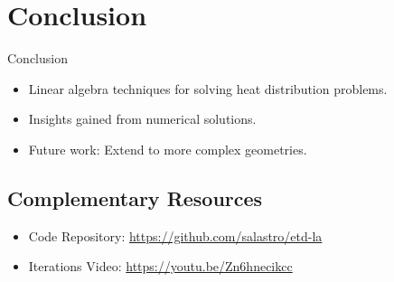 \documentclass[aspectratio=169]{beamer}
\begin{document}

\section{Conclusion}

\begin{frame}{Conclusion}
  \begin{itemize}
    \item Linear algebra techniques for solving heat distribution problems.
    \item Insights gained from numerical solutions.
    \item Future work: Extend to more complex geometries.
  \end{itemize}
\end{frame}

\begin{frame}
  \section{Complementary Resources}
  \begin{itemize}
    \item Code Repository: \url{https://github.com/salastro/etd-la}
    \item Iterations Video: \url{https://youtu.be/Zn6hnecikcc}
  \end{itemize}
\end{frame}

\begin{frame}
  \printbibliography
\end{frame}
\end{document}
